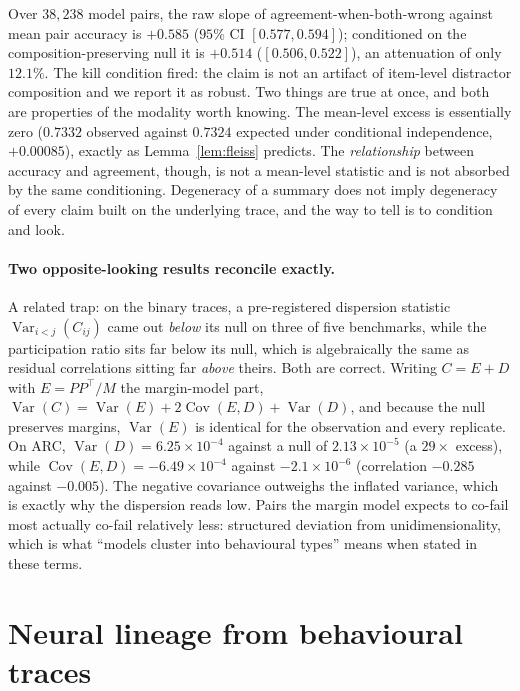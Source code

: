 \documentclass{article}
\begin{document}
Over $38{,}238$ model pairs, the raw slope of agreement-when-both-wrong against mean pair accuracy
is $+0.585$ ($95\%$ CI $[0.577,0.594]$); conditioned on the composition-preserving null it is
$+0.514$ ($[0.506,0.522]$), an attenuation of only $12.1\%$. The kill condition fired: the claim is
not an artifact of item-level distractor composition and we report it as robust. Two things are
true at once, and both are properties of the modality worth knowing. The mean-level excess is
essentially zero ($0.7332$ observed against $0.7324$ expected under conditional independence,
$+0.00085$), exactly as Lemma~\ref{lem:fleiss} predicts. The \emph{relationship} between
accuracy and agreement, though, is not a mean-level statistic and is not absorbed by the same conditioning.
Degeneracy of a summary does not imply degeneracy of every claim built on the underlying trace, and
the way to tell is to condition and look.

\paragraph{Two opposite-looking results reconcile exactly.} A related trap: on the binary traces, a
pre-registered dispersion statistic $\operatorname{Var}_{i<j}(C_{ij})$ came out \emph{below} its
null on three of five benchmarks, while the participation ratio sits far below its null, which is
algebraically the same as residual correlations sitting far \emph{above} theirs. Both are correct.
Writing $C=E+D$ with $E=PP^{\!\top}/M$ the margin-model part,
$\operatorname{Var}(C)=\operatorname{Var}(E)+2\operatorname{Cov}(E,D)+\operatorname{Var}(D)$, and
because the null preserves margins, $\operatorname{Var}(E)$ is identical for the observation and
every replicate. On ARC, $\operatorname{Var}(D)=6.25\times10^{-4}$ against a null of
$2.13\times10^{-5}$ (a $29\times$ excess), while $\operatorname{Cov}(E,D)=-6.49\times10^{-4}$
against $-2.1\times10^{-6}$ (correlation $-0.285$ against $-0.005$). The negative covariance
outweighs the inflated variance, which is exactly why the dispersion reads low. Pairs the margin
model expects to co-fail most actually co-fail relatively less: structured deviation from
unidimensionality, which is what ``models cluster into behavioural types'' means when stated in
these terms.

\section{Neural lineage from behavioural traces}
\label{sec:lineage}
\end{document}
